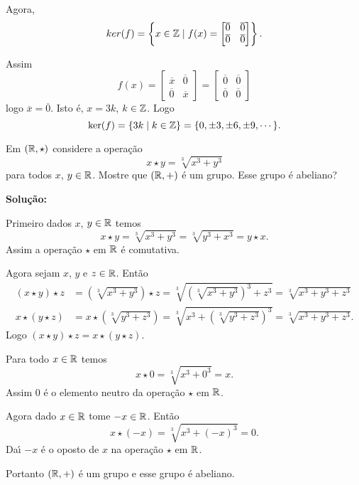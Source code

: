 \documentclass[12pt]{exam}
\begin{document}
Agora,
\[
	ker(f) = \left\{x \in \mathbb{Z} \mid f(x) = \begin{bmatrix}
		\overline{0} & \overline{0}\\
		\overline{0} & \overline{0}
	\end{bmatrix}\right\}.
\]

Assim
\[
	f(x) = \begin{bmatrix}
		\overline{x} & \overline{0}\\
		\overline{0} & \overline{x}
	\end{bmatrix} = \begin{bmatrix}
		\overline{0} & \overline{0}\\
		\overline{0} & \overline{0}
	\end{bmatrix}
\]
logo $\overline{x} = \overline{0}$. Isto \'e, $x = 3k$, $k \in \mathbb{Z}$. Logo 
\[
	\ker(f) = \{3k \mid k \in \mathbb{Z}\} = \{0, \pm 3, \pm 6, \pm 9, \cdots\}.
\]

\vspace{1cm}

\questao{} Em $(\mathbb{R} , \star)$ considere a opera\c{c}\~ao
\[
	x\star y = \sqrt[3]{x^3 + y^3}
\]
para todos $x$, $y \in \mathbb{R}$. Mostre que $(\mathbb{R}, +)$ \'e um grupo. Esse grupo \'e abeliano?

\noindent\textbf{Solu\c{c}\~ao:}

Primeiro dados $x$, $y \in \mathbb{R}$ temos
\[
	x \star y = \sqrt[3]{x^3 + y^3} = \sqrt[3]{y^3 + x^3} = y \star x.
\]
Assim a opera\c{c}\~ao $\star$ em $\mathbb{R}$ \'e comutativa.

Agora sejam $x$, $y$ e $z \in \mathbb{R}$. Ent\~ao
\begin{align*}
	(x \star y) \star z &= (\sqrt[3]{x^3 + y^3})\star z = \sqrt[3]{(\sqrt[3]{x^3 + y^3})^3 + z^3} = \sqrt[3]{x^3 + y^3 + z^3}\\
	x \star (y \star z) &= x \star (\sqrt[3]{y^3 + z^3}) = \sqrt[3]{x^3 + (\sqrt[3]{y^3 + z^3})^3} = \sqrt[3]{x^3 + y^3 + z^3}.
\end{align*}
Logo $(x \star y) \star z = x \star (y \star z)$.

Para todo $x \in \mathbb{R}$ temos
\[
	x \star 0 = \sqrt[3]{x^3 + 0^3} = x.
\]
Assim $0$ \'e o elemento neutro da opera\c{c}\~ao $\star$ em $\mathbb{R}$.

Agora dado $x \in \mathbb{R}$ tome $-x \in \mathbb{R}$. Ent\~ao
\[
	x \star (-x) = \sqrt[3]{x^3 + (-x)^3} = 0.
\]
Da{\'\i} $-x$ \'e o oposto de $x$ na opera\c{c}\~ao $\star$ em $\mathbb{R}$.

Portanto $(\mathbb{R},+)$ \'e um grupo e esse grupo \'e abeliano.
\end{document}
